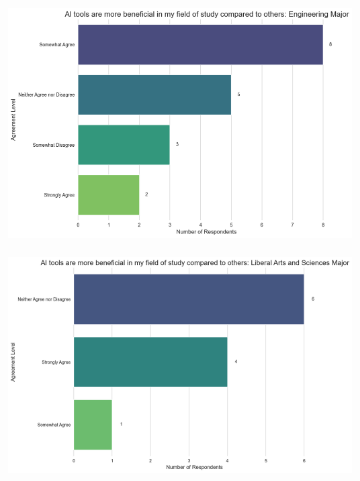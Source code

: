 \documentclass[12pt]{article}
\begin{document}
\begin{figure}[htbp]
  \centering
  \begin{subfigure}[b]{0.45\textwidth}
    \includegraphics[width=\textwidth]{fig10-1.png} %
    \label{fig:subfig1a}
  \end{subfigure}
  \hfill %
  \begin{subfigure}[b]{0.45\textwidth}
    \includegraphics[width=\textwidth]{fig10-2.png} %
    \label{fig:subfig1b}
  \end{subfigure}
  \hfill %
  \begin{subfigure}[b]{0.45\textwidth}

\end{subfigure}
\end{figure}
\end{document}
